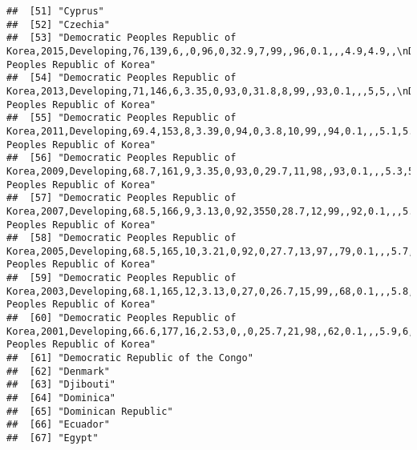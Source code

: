 \documentclass[
]{article}
\begin{document}
\begin{verbatim}
##  [51] "Cyprus"                                                                                                                                               
##  [52] "Czechia"                                                                                                                                              
##  [53] "Democratic Peoples Republic of Korea,2015,Developing,76,139,6,,0,96,0,32.9,7,99,,96,0.1,,,4.9,4.9,,\nDemocratic Peoples Republic of Korea"            
##  [54] "Democratic Peoples Republic of Korea,2013,Developing,71,146,6,3.35,0,93,0,31.8,8,99,,93,0.1,,,5,5,,\nDemocratic Peoples Republic of Korea"            
##  [55] "Democratic Peoples Republic of Korea,2011,Developing,69.4,153,8,3.39,0,94,0,3.8,10,99,,94,0.1,,,5.1,5.2,,\nDemocratic Peoples Republic of Korea"      
##  [56] "Democratic Peoples Republic of Korea,2009,Developing,68.7,161,9,3.35,0,93,0,29.7,11,98,,93,0.1,,,5.3,5.3,,\nDemocratic Peoples Republic of Korea"     
##  [57] "Democratic Peoples Republic of Korea,2007,Developing,68.5,166,9,3.13,0,92,3550,28.7,12,99,,92,0.1,,,5.5,5.5,,\nDemocratic Peoples Republic of Korea"  
##  [58] "Democratic Peoples Republic of Korea,2005,Developing,68.5,165,10,3.21,0,92,0,27.7,13,97,,79,0.1,,,5.7,5.7,,\nDemocratic Peoples Republic of Korea"    
##  [59] "Democratic Peoples Republic of Korea,2003,Developing,68.1,165,12,3.13,0,27,0,26.7,15,99,,68,0.1,,,5.8,5.8,,\nDemocratic Peoples Republic of Korea"    
##  [60] "Democratic Peoples Republic of Korea,2001,Developing,66.6,177,16,2.53,0,,0,25.7,21,98,,62,0.1,,,5.9,6,,\nDemocratic Peoples Republic of Korea"        
##  [61] "Democratic Republic of the Congo"                                                                                                                     
##  [62] "Denmark"                                                                                                                                              
##  [63] "Djibouti"                                                                                                                                             
##  [64] "Dominica"                                                                                                                                             
##  [65] "Dominican Republic"                                                                                                                                   
##  [66] "Ecuador"                                                                                                                                              
##  [67] "Egypt"                                                                                                                                                

\end{verbatim}
\end{document}
